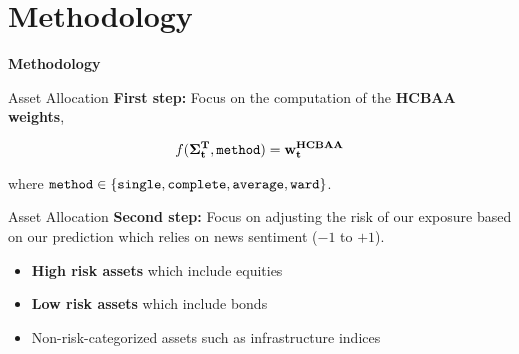 

\section{Methodology}
\begin{frame}[noframenumbering]
	\begin{center}
	    \textbf{\huge{Methodology}}
	\end{center}
\end{frame}

\begin{frame}{Asset Allocation}
\textbf{First step:} Focus on the computation of the \textbf{HCBAA weights},
\vspace{0.4cm}

\begin{align*}
    f(\mathbf{\Sigma_t^T}, \text{\texttt{method}}) = \mathbf{w_t^{HCBAA}}
\end{align*}

\vspace{0.4cm}

where $\text{\texttt{method}} \in \{\text{\texttt{single}}, \text{\texttt{complete}}, \text{\texttt{average}}, \text{\texttt{ward}} \}$.

\end{frame}

\begin{frame}{Asset Allocation}
\textbf{Second step:} Focus on adjusting the risk of our exposure based on our prediction which relies on news sentiment ($-1$ to $+1$).
\vspace{0.4cm}

\begin{itemize}
    \item \textbf{High risk assets} which include equities
    \item \textbf{Low risk assets} which include bonds
    \item Non-risk-categorized assets such as infrastructure indices
\end{itemize}

\end{frame}


